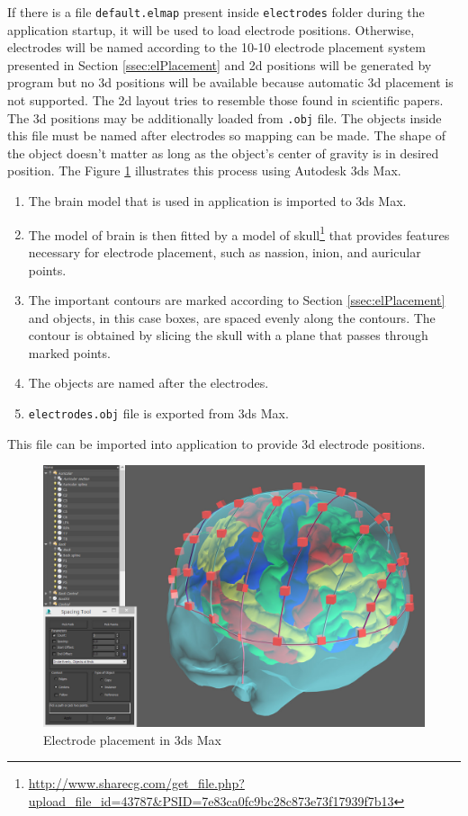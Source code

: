 If there is a file \texttt{default.elmap} present inside \texttt{electrodes} folder during the application startup, it will be used to load electrode positions. Otherwise, electrodes will be named according to the 10-10 electrode placement system presented in Section \ref{ssec:elPlacement} and \gls{2d} positions will be generated by program but no \gls{3d} positions will be available because automatic \gls{3d} placement is not supported. The \gls{2d} layout tries to resemble those found in scientific papers. The \gls{3d} positions may be additionally loaded from \texttt{.obj} file. The objects inside this file must be named after electrodes so mapping can be made. The shape of the object doesn't matter as long as the object's center of gravity is in desired position. The Figure \ref{fig:3DSMaxPlacement} illustrates this process using Autodesk 3ds Max. 
\begin{enumerate}
	\item The brain model that is used in application is imported to 3ds Max.
	\item The model of brain is then fitted by a model of skull\footnote{\url{http://www.sharecg.com/get_file.php?upload_file_id=43787&PSID=7e83ca0fc9bc28c873e73f17939f7b13}} that provides features necessary for electrode placement, such as nassion, inion, and auricular points.
	\item The important contours are marked according to Section \ref{ssec:elPlacement} and objects, in this case boxes, are spaced evenly along the contours. The contour is obtained by slicing the skull with a plane that passes through marked points. 
	\item The objects are named after the electrodes.
	\item \texttt{electrodes.obj} file is exported from 3ds Max.
\end{enumerate}
This file can be imported into application to provide \gls{3d} electrode positions.

\begin{figure}[htb]
	\centering
	\includegraphics[width=1\linewidth]{fig/3DSMaxPlacement.jpg}
	\caption{Electrode placement in 3ds Max}
	\label{fig:3DSMaxPlacement}
\end{figure}


